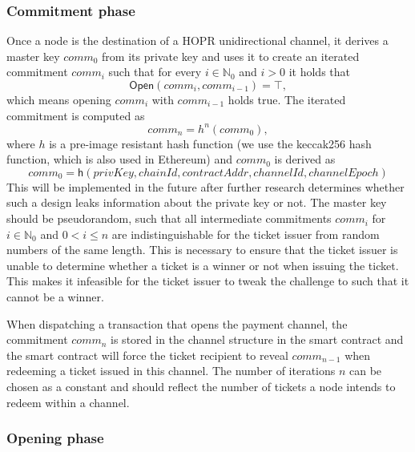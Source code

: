 \subsubsection{Commitment phase}

Once a node is the destination of a HOPR unidirectional channel, it derives a
master key $comm_0$ from its private key and uses it to create an iterated
commitment $comm_i$ such that for every $i \in \mathbb{N}_0$ and $i > 0$ it
holds that $$ \mathsf{Open}(comm_{i}, comm_{i-1}) = \top,$$ which means opening
$comm_{i}$ with $comm_{i-1}$ holds true.
The iterated commitment is computed as $$comm_n = h^n(comm_0),$$ where $h$ is a
pre-image resistant hash function (we use the keccak256 hash function, which is also used
in Ethereum) and $comm_0$ is derived as $$ comm_0 = \mathsf{h}(privKey,chainId,
contractAddr, channelId, channelEpoch)$$
This will be implemented in the future after further research
determines whether such a design leaks information about the
private key or not. 
The master key should be pseudorandom, such that
all intermediate commitments $comm_{i}$ for $i \in \mathbb{N}_0$ and $0 < i \le
n$ are indistinguishable for the ticket issuer from random numbers of the same
length. This is necessary to ensure that the ticket issuer is unable to
determine whether a ticket is a winner or not when issuing the ticket. This makes
it infeasible for the ticket issuer to tweak the challenge to such that it
cannot be a winner.

When dispatching a transaction that opens the payment channel, the
commitment $comm_n$ is stored in the channel structure in the smart contract and
the smart contract will force the ticket recipient to reveal $comm_{n-1}$ when
redeeming a ticket issued in this channel. The number of iterations $n$ can be
chosen as a constant and should reflect the number of tickets a node intends to
redeem within a channel.

\subsubsection{Opening phase}

